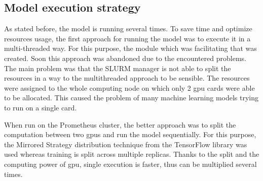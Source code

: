 \subsection{Model execution strategy}\label{subsec:model-execution-strategy}
As stated before, the model is running several times.
To save time and optimize resources usage, the first approach for running the model was to execute it in a multi-threaded way.
For this purpose, the module which was facilitating that was created.
Soon this approach was abandoned due to the encountered problems.
The main problem was that the SLURM manager is not able to split the resources in a way to the multithreaded approach to be sensible.
The resources were assigned to the whole computing node on which only 2 \gls{gpu} cards were able to be allocated.
This caused the problem of many machine learning models trying to run on a single card.

When run on the Prometheus cluster, the better approach was to split the computation between two \gls{gpu}s and run the model sequentially.
For this purpose, the Mirrored Strategy distribution technique from the TensorFlow library was used whereas training is split across multiple replicas.
Thanks to the split and the computing power of \gls{gpu}, single execution is faster, thus can be multiplied several times.

